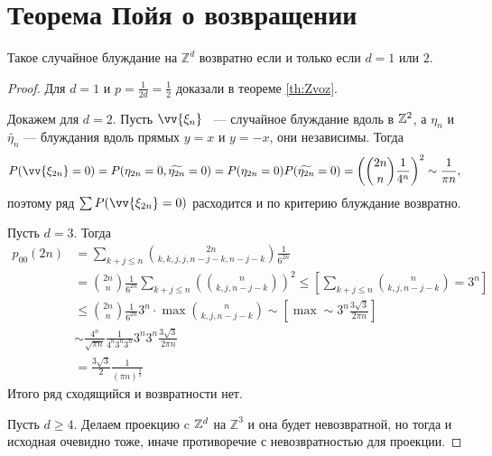 \section{Теорема Пойя о возвращении}

\begin{theorem}
    Такое случайное блуждание на $\mathbb{Z}^d$ возвратно если и только если $d = 1$ или $2$.
\end{theorem}

\begin{proof}
    Для $d = 1$ и $p = \frac{1}{2d} = \frac{1}{2}$ доказали в теореме \ref{th:Zvoz}. 

   Докажем для $d = 2$. Пусть $\vv{\xi_n}$ ~--- случайное блуждание вдоль в $\mathbb{Z}^2$, а $\eta_n$ и $\widetilde{\eta_n}$ --- блуждания вдоль прямых $y=x$ и $y = -x$, они независимы. Тогда
$$P(\vv{\xi_{2n}} = 0)= P(\eta_{2n} = 0, \widetilde{\eta_{2n}} = 0) = P(\eta_{2n} = 0)P( \widetilde{\eta_{2n}} = 0)=
        \left(\binom{2n}{n}\frac{1}{4^n}\right)^2 \sim \frac{1}{\pi n},$$ поэтому ряд $\sum P(\vv{\xi_{2n}} = 0)$ расходится и по критерию блуждание возвратно.

 

       Пусть $d = 3$.
       Тогда
       \begin{align*}
           p_{00}(2n) &= \sum\limits_{k + j \le n} \binom{2n}{k,k,j,j, n - j - k, n-j-k} \frac{1}{6^{2n}} \\&=
        \binom{2n}{n}\frac{1}{6^{2n}}\sum\limits_{k + j\le n}\left(\binom{n}{k,j,n-j-k}\right)^2 \le \left[\sum\limits_{k + j\le n}\binom{n}{k,j,n-j-k} = 3^n\right] \\&\le \binom{2n}{n}\frac{1}{6^{2n}}3^n\cdot\max\binom{n}{k,j,n-j-k} \sim \left[\max \sim 3^n \frac{3\sqrt{3}}{2\pi n}\right] \\&\sim \frac{4^n}{\sqrt{\pi n}}\frac{1}{4^n3^n3^n}3^n3^n\frac{3\sqrt{3}}{2\pi n} \\&= \frac{3\sqrt{3}}{2}\frac{1}{(\pi n)^{\frac{3}{2}}}
       \end{align*}
   Итого ряд сходящийся и возвратности нет.
    
   
    Пусть $d \ge 4$. Делаем проекцию c $\mathbb{Z}^d$ на $\mathbb{Z}^3$ и она будет невозвратной, но тогда и исходная очевидно тоже, иначе противоречие с невозвратностью для проекции.
\end{proof}